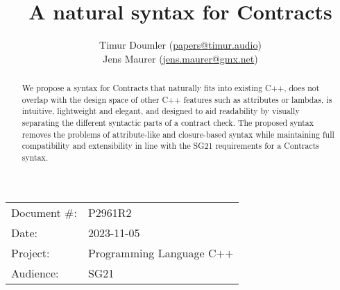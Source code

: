



\usepackage{titlesec}
\usepackage{tocloft}


\newcommand{\changelocaltocdepth}[1]{%
  \addtocontents{toc}{\protect\setcounter{tocdepth}{#1}}%
  \setcounter{tocdepth}{#1}%
}

\setcounter{tocdepth}{3}



\title{A natural syntax for Contracts}
\author{ Timur Doumler \small(\href{mailto:papers@timur.audio}{papers@timur.audio})\\
Jens Maurer \small(\href{mailto:jens.maurer@gmx.net}{jens.maurer@gmx.net})}
\date{}
\maketitle

\begin{tabular}{ll}
Document \#: & P2961R2 \\
Date: &2023-11-05\\
Project: & Programming Language C++ \\
Audience: & SG21
\end{tabular}

\begin{abstract}
We propose a syntax for Contracts that naturally fits into existing C++, does not overlap with the design space of other C++ features such as attributes or lambdas, is intuitive, lightweight and elegant, and designed to aid readability by visually separating the different syntactic parts of a contract check. The proposed syntax removes the problems of attribute-like and closure-based syntax while maintaining full compatibility and extensibility in line with the SG21 requirements for a Contracts syntax.
\end{abstract}


\tableofcontents*



